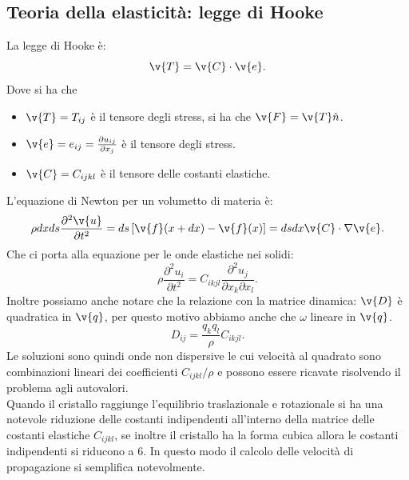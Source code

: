 \subsection{Teoria della elasticità: legge di Hooke}%
\label{sub:Teoria della elasticità: legge di Hooke}
La legge di Hooke è:
\[
\v{T}=\v{C}\cdot \v{e}
.\] 
Dove si ha che 
\begin{itemize}
    \item $\v{T}=T_{ij}$ è il tensore degli stress, si ha che $\v{F}=\v{T}\hat{n}$.
    \item $\v{e}=e_{ij}=\frac{\partial u_{ij}}{\partial x_j}$ è il tensore degli stress.
    \item $\v{C}=C_{ijkl}$ è il tensore delle costanti elastiche.
\end{itemize}
L'equazione di Newton per un volumetto di materia è:
\[
    \rho dxds\frac{\partial ^2\v{u}}{\partial t^2} = ds\left[\v{f}(x+dx) - \v{f}(x) \right] = dsdx \v{C}\cdot \nabla \v{e} 
.\] 
Che ci porta alla equazione per le onde elastiche nei solidi:
\[
    \rho\frac{\partial ^2 u_i }{\partial t^2}= C_{ikjl}\frac{\partial ^2 u_j}{\partial x_k \partial x_l}  
.\] 
Inoltre possiamo anche notare che la relazione con la matrice dinamica: $\v{D}$ è quadratica in $\v{q}$, per questo motivo abbiamo anche che $\omega$ lineare in $\v{q}$.
\[
D_{ij}= \frac{q_k q_l}{\rho}C_{ikjl}
.\] 
Le soluzioni sono quindi onde non dispersive le cui velocità al quadrato sono combinazioni lineari dei coefficienti $C_{ijkl} /\rho$ e possono essere ricavate risolvendo il problema agli autovalori.\\
Quando il cristallo raggiunge l'equilibrio traslazionale e rotazionale si ha una notevole riduzione delle costanti indipendenti all'interno della matrice delle costanti elastiche $C_{ijkl}$, se inoltre il cristallo ha la forma cubica allora le costanti indipendenti si riducono a 6. In questo modo il calcolo delle velocità di propagazione si semplifica notevolmente.
